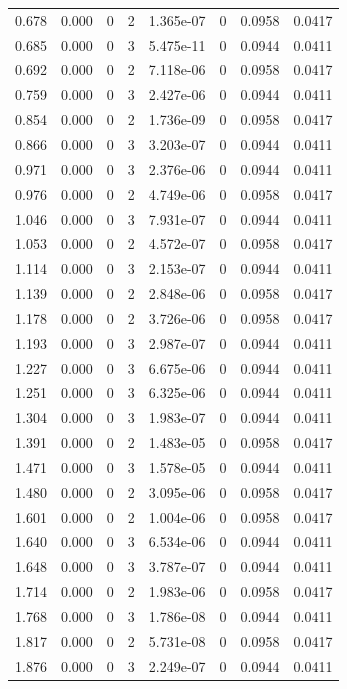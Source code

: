 \documentclass[preview]{standalone}
\begin{document}
{{\begin{tabular}{L{1.2cm}C{1.2cm} C{0.3cm}C{0.5cm} C{1.4cm}C{1.4cm} C{1.4cm}C{1.4cm}}
  0.678  &  0.000  & 0     &  2 &  1.365e-07  & 0  & 0.0958 &  0.0417   \\ 
  0.685  &  0.000  & 0     &  3 &  5.475e-11  & 0  & 0.0944 &  0.0411   \\ 
  0.692  &  0.000  & 0     &  2 &  7.118e-06  & 0  & 0.0958 &  0.0417   \\ 
  0.759  &  0.000  & 0     &  3 &  2.427e-06  & 0  & 0.0944 &  0.0411   \\ 
  0.854  &  0.000  & 0     &  2 &  1.736e-09  & 0  & 0.0958 &  0.0417   \\ 
  0.866  &  0.000  & 0     &  3 &  3.203e-07  & 0  & 0.0944 &  0.0411   \\ 
  0.971  &  0.000  & 0     &  3 &  2.376e-06  & 0  & 0.0944 &  0.0411   \\ 
  0.976  &  0.000  & 0     &  2 &  4.749e-06  & 0  & 0.0958 &  0.0417   \\ 
  1.046  &  0.000  & 0     &  3 &  7.931e-07  & 0  & 0.0944 &  0.0411   \\ 
  1.053  &  0.000  & 0     &  2 &  4.572e-07  & 0  & 0.0958 &  0.0417   \\ 
  1.114  &  0.000  & 0     &  3 &  2.153e-07  & 0  & 0.0944 &  0.0411   \\ 
  1.139  &  0.000  & 0     &  2 &  2.848e-06  & 0  & 0.0958 &  0.0417   \\ 
  1.178  &  0.000  & 0     &  2 &  3.726e-06  & 0  & 0.0958 &  0.0417   \\ 
  1.193  &  0.000  & 0     &  3 &  2.987e-07  & 0  & 0.0944 &  0.0411   \\ 
  1.227  &  0.000  & 0     &  3 &  6.675e-06  & 0  & 0.0944 &  0.0411   \\ 
  1.251  &  0.000  & 0     &  3 &  6.325e-06  & 0  & 0.0944 &  0.0411   \\ 
  1.304  &  0.000  & 0     &  3 &  1.983e-07  & 0  & 0.0944 &  0.0411   \\ 
  1.391  &  0.000  & 0     &  2 &  1.483e-05  & 0  & 0.0958 &  0.0417   \\ 
  1.471  &  0.000  & 0     &  3 &  1.578e-05  & 0  & 0.0944 &  0.0411   \\ 
  1.480  &  0.000  & 0     &  2 &  3.095e-06  & 0  & 0.0958 &  0.0417   \\ 
  1.601  &  0.000  & 0     &  2 &  1.004e-06  & 0  & 0.0958 &  0.0417   \\ 
  1.640  &  0.000  & 0     &  3 &  6.534e-06  & 0  & 0.0944 &  0.0411   \\ 
  1.648  &  0.000  & 0     &  3 &  3.787e-07  & 0  & 0.0944 &  0.0411   \\ 
  1.714  &  0.000  & 0     &  2 &  1.983e-06  & 0  & 0.0958 &  0.0417   \\ 
  1.768  &  0.000  & 0     &  3 &  1.786e-08  & 0  & 0.0944 &  0.0411   \\ 
  1.817  &  0.000  & 0     &  2 &  5.731e-08  & 0  & 0.0958 &  0.0417   \\ 
  1.876  &  0.000  & 0     &  3 &  2.249e-07  & 0  & 0.0944 &  0.0411   \\ 
\hline 
\end{tabular} 

}}
\end{document}
